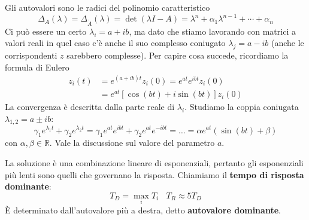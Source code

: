 Gli autovalori sono le radici del polinomio caratteristico
\begin{equation*}
	\Delta _A\left(\lambda \right) =\Delta _{\tilde{A}}\left(\lambda \right) =\det\left(\lambda I-A\right) =\lambda ^n +\alpha _1 \lambda ^{n-1} +\cdots +\alpha _n
\end{equation*}
Ci può essere un certo $\lambda _i =a+ib$, ma dato che stiamo lavorando con matrici a valori reali in quel caso c'è anche il suo complesso coniugato $\lambda _j =a-ib$ (anche le corrispondenti $z$ sarebbero complesse). Per capire cosa succede, ricordiamo la formula di Eulero
\begin{equation*}
	\begin{aligned}
		z_i\left(t\right) & =e^{\left(a+ib\right) t} z_i\left(0\right) =e^{at} e^{ibt} z_i\left(0\right)    \\
		                   & =e^{at}\left[\cos\left(bt\right) +i\sin\left(bt\right)\right] z_i\left(0\right) 
	\end{aligned}
\end{equation*}
La convergenza è descritta dalla parte reale di $\lambda _i$. Studiamo la coppia coniugata $\lambda _{1,2} =a\pm ib$:
\begin{equation*}
	\gamma _1 e^{\lambda _1 t} +\gamma _2 e^{\lambda _2 t} =\gamma _1 e^{at} e^{ibt} +\gamma _2 e^{at} e^{-ibt} =\dotsc =\alpha e^{at}\left(\sin\left(bt\right) +\beta \right)
\end{equation*}
con $\alpha ,\beta \in \mathbb{R}$. Vale la discussione sul valore del parametro $a$.

La soluzione è una combinazione lineare di esponenziali, pertanto gli esponenziali più lenti sono quelli che governano la risposta. Chiamiamo il \textbf{tempo di risposta dominante}:
\begin{equation*}
	\boxed{T_D =\max_i T_i} \ \ \ \ \boxed{T_R \approx 5T_D}
\end{equation*}
È determinato dall'autovalore più a destra, detto \textbf{autovalore dominante}.

